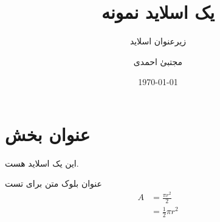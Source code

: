 \documentclass[babel={layout=lists},10pt]{beamer-rl}
\title{یک اسلاید نمونه}
\subtitle{زیرعنوان اسلاید}
\author{مجتبیٰ احمدی}
\institute[پیام‌نو‌ر مشگین شهر]{دانشگاه: پیام‌نو‌ر مشگین شهر}
\date{\today}
\begin{document}
\begin{frame}
\titlepage
\end{frame}
\section{عنوان بخش}
\begin{frame}
این یک اسلاید هست.
\begin{block}{عنوان بلوک}
متن برای تست
\begin{align*}
A & = \frac{\pi r^2}{2} \\
 & = \frac{1}{2} \pi r^2
\end{align*}
\end{block}
\end{frame}
\end{document}
